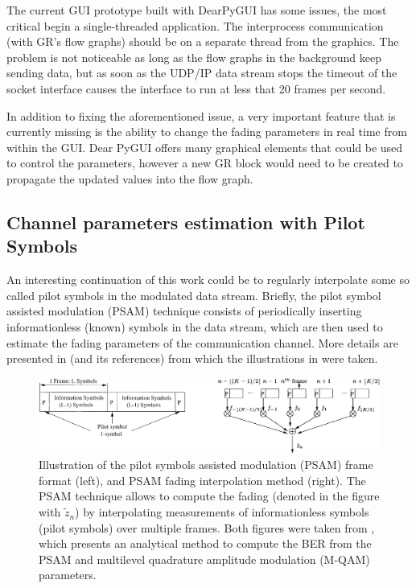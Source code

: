 The current GUI prototype built with DearPyGUI has some issues, the most critical begin a single-threaded application. The interprocess communication (with GR's flow graphs) should be on a separate thread from the graphics. The problem is not noticeable as long as the flow graphs in the background keep sending data, but as soon as the UDP/IP data stream stops the timeout of the socket interface causes the interface to run at less that 20 frames per second.

In addition to fixing the aforementioned issue, a very important feature that is currently missing is the ability to change the fading parameters in real time from within the GUI. Dear PyGUI offers many graphical elements that could be used to control the parameters, however a new GR block would need to be created to propagate the updated values into the flow graph.

\subsection{Channel parameters estimation with Pilot Symbols}

An interesting continuation of this work could be to regularly interpolate some so called pilot symbols in the modulated data stream. Briefly, the pilot symbol assisted modulation (PSAM) technique consists of periodically inserting informationless (known) symbols in the data stream, which are then used to estimate the fading parameters of the communication channel. More details are presented in \cite{Xiaoyi1999} (and its references) from which the illustrations in  were taken.

\begin{figure}
	\centering
	\includegraphics[width = \linewidth]{figures/xiaoyi-psam-figures}
	\caption{
		Illustration of the pilot symbols assisted modulation (PSAM) frame format (left), and PSAM fading interpolation method (right). The PSAM technique allows to compute the fading (denoted in the figure with \(\tilde{z}_n\)) by interpolating measurements of informationless symbols (pilot symbols) over multiple frames. Both figures were taken from \cite{Xiaoyi1999}, which presents an analytical method to compute the BER from the PSAM and multilevel quadrature amplitude modulation (M-QAM) parameters.
		\label{fig:psam}
	}
\end{figure}

